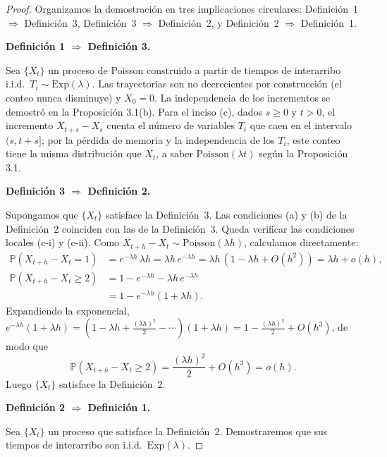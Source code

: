 \documentclass[12pt]{book}
\begin{document}
\begin{proof}
Organizamos la demostración en tres implicaciones circulares: Definición~1 $\Rightarrow$ Definición~3, Definición~3 $\Rightarrow$ Definición~2, y Definición~2 $\Rightarrow$ Definición~1.

\medskip
\textbf{Definición 1 $\Rightarrow$ Definición 3.}

Sea $\{X_t\}$ un proceso de Poisson construido a partir de tiempos de interarribo i.i.d.\ $T_i \sim \mathrm{Exp}(\lambda)$. Las trayectorias son no decrecientes por construcción (el conteo nunca disminuye) y $X_0 = 0$. La independencia de los incrementos se demostró en la Proposición 3.1(b). Para el inciso (c), dados $s \ge 0$ y $t > 0$, el incremento $X_{t+s} - X_s$ cuenta el número de variables $T_i$ que caen en el intervalo $(s, t+s]$; por la pérdida de memoria y la independencia de los $T_i$, este conteo tiene la misma distribución que $X_t$, a saber $\mathrm{Poisson}(\lambda t)$ según la Proposición 3.1.

\medskip
\textbf{Definición 3 $\Rightarrow$ Definición 2.}

Supongamos que $\{X_t\}$ satisface la Definición~3. Las condiciones (a) y (b) de la Definición~2 coinciden con las de la Definición~3. Queda verificar las condiciones locales (c-i) y (c-ii). Como $X_{t+h} - X_t \sim \mathrm{Poisson}(\lambda h)$, calculamos directamente:
\begin{align*}
    \mathbb{P}(X_{t+h} - X_t = 1) &= e^{-\lambda h}\,\lambda h = \lambda h\,e^{-\lambda h} = \lambda h\,(1 - \lambda h + O(h^2)) = \lambda h + o(h),\\[4pt]
    \mathbb{P}(X_{t+h} - X_t \ge 2) &= 1 - e^{-\lambda h} - \lambda h\,e^{-\lambda h}\\
    &= 1 - e^{-\lambda h}(1 + \lambda h).
\end{align*}
Expandiendo la exponencial, $e^{-\lambda h}(1+\lambda h) = (1 - \lambda h + \tfrac{(\lambda h)^2}{2} - \cdots)(1+\lambda h) = 1 - \tfrac{(\lambda h)^2}{2} + O(h^3)$, de modo que
\[
    \mathbb{P}(X_{t+h} - X_t \ge 2) = \frac{(\lambda h)^2}{2} + O(h^3) = o(h).
\]
Luego $\{X_t\}$ satisface la Definición~2.

\medskip
\textbf{Definición 2 $\Rightarrow$ Definición 1.}

Sea $\{X_t\}$ un proceso que satisface la Definición~2. Demostraremos que sus tiempos de interarribo son i.i.d.\ $\mathrm{Exp}(\lambda)$.


\end{proof}
\end{document}
